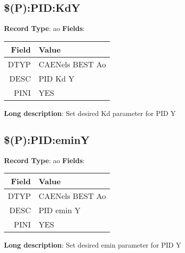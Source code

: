 \subsection{\$(P):PID:KdY}
\textbf{Record Type}: ao \newline \newline 
\textbf{Fields}: \newline 
\begin{tabularx}{0.7\linewidth}{|r|X|}
\hline Field & Value \\
\hline
\hline
DTYP & CAENels BEST Ao\\
\hline
DESC & PID Kd Y\\
\hline
PINI & YES\\
\hline
\end{tabularx}
\newline \newline \newline
\textbf{Long description}: \newline 
 Set desired Kd parameter for PID Y
\newline \newline

\subsection{\$(P):PID:eminY}
\textbf{Record Type}: ao \newline \newline 
\textbf{Fields}: \newline 
\begin{tabularx}{0.7\linewidth}{|r|X|}
\hline Field & Value \\
\hline
\hline
DTYP & CAENels BEST Ao\\
\hline
DESC & PID emin Y\\
\hline
PINI & YES\\
\hline
\end{tabularx}
\newline \newline \newline
\textbf{Long description}: \newline 
 Set desired emin parameter for PID Y
\newline \newline

